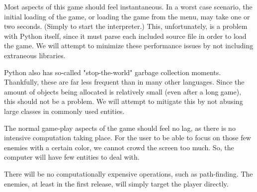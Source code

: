 Most aspects of this game should feel instantaneous.  In a worst
case scenario, the initial loading of the game, or loading the game
from the menu, may take one or two seconds. (Simply to start the
interpreter.)  This, unfortunately, is a problem with Python itself,
since it must parse each included source file in order to load the game.
We will attempt to minimize these performance issues by not including
extraneous libraries.

Python also has so-called "stop-the-world" garbage collection moments.
Thankfully, these are far less frequent than in many other languages.
Since the amount of objects being allocated is relatively small (even
after a long game), this should not be a problem.  We will attempt
to mitigate this by not abusing large classes in commonly used entities.

The normal game-play aspects of the game should feel no lag, as there is
no intensive computation taking place.  For the user to be able to
focus on those few enemies with a certain color, we cannot crowd the
screen too much.  So, the computer will have few entities to deal with.

There will be no computationally expensive operations, such as path-finding.
The enemies, at least in the first release, will simply target the player
directly.
